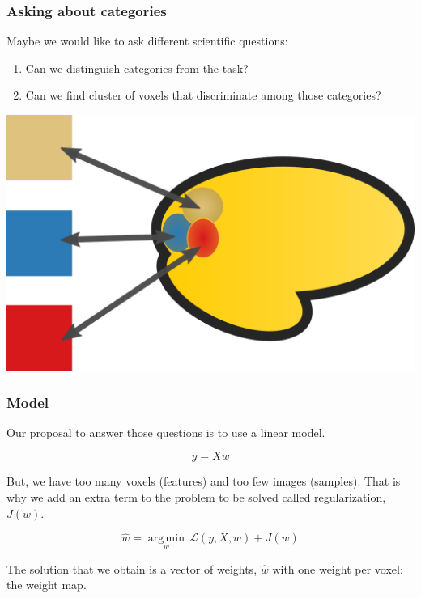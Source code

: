 \documentclass[11pt]{beamer}
\begin{document}
\begin{frame}
    \frametitle{Asking about categories}

    Maybe we would like to ask different scientific questions:
    \begin{enumerate}
        \item Can we distinguish categories from the task?
        \item Can we find cluster of voxels that discriminate among those categories?
    \end{enumerate}

    \begin{center}
        \includegraphics[scale=0.2]{figures/decoding.png}
    \end{center}

\end{frame}

\begin{frame}
    \frametitle{Model}
    Our proposal to answer those questions is to use a linear model. 

    \[y = Xw\]

    But, we have too many voxels (features) and too few images (samples). That
    is why we add an extra term to the problem to be solved called
    regularization, $J(w)$.

    \[\hat{w} = \underset{w}{\operatorname{arg\,min}} \,
        \mathcal{L}\left(y, X, w \right) + J(w) \]

    The solution that we obtain is a vector of weights, $\hat{w}$ with one
    weight per voxel: the weight map.  

\end{frame}
\end{document}
